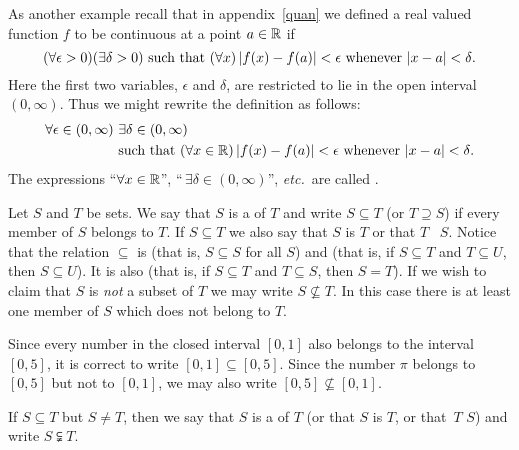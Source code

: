 As another example recall that in appendix~\ref{quan} we defined a real valued function $f$ to
be continuous at a point $a \in \mathbb{R}$ if
  \[(\forall\epsilon > 0)(\exists \delta > 0) \text{ such that
        $(\forall x)\, \lvert f(x)-f(a)\rvert < \epsilon$  whenever
            $\lvert x - a\rvert < \delta$}.\]
Here the first two variables, $\epsilon$ and $\delta$, are restricted to lie in the open
interval $(0, \infty)$. Thus we might rewrite the definition as follows:
  \[\begin{split}
    \forall\epsilon\in (0,\infty)\,\, &\exists\delta\in (0,\infty) \\
        &\text{such that ($\forall x \in \mathbb{R})\, \lvert f(x)-f(a)\rvert
        <\epsilon$ whenever $\lvert x-a\rvert < \delta$}.
  \end{split}\]
The expressions ``$\forall x \in \mathbb{R}$'', ``\,$\exists\delta\in (0, \infty)$'', \emph{etc.}\ are
called
.

\begin{defn} Let $S$ and $T$ be sets. We say that $S$ is a
 of $T$ and write
$S \subseteq T$ (or $T \supseteq S$) if every member of $S$ belongs to $T$. If $S \subseteq T$
we also say that $S$ is  $T$ or that $T$
~$S$.  Notice that the relation $\subseteq$ is
 (that is, $S \subseteq S$ for all $S$) and
 (that is, if $S \subseteq T$ and $T \subseteq U$,
then $S \subseteq U$). It is also
 (that is, if $S \subseteq T$ and $T \subseteq S$, then $S = T$). If we wish
to claim that $S$ is \emph{not} a subset of $T$ we may write $S \not\subseteq T$. In this case
there is at least one member of $S$ which does not belong to $T$.
\end{defn}

\begin{exam} Since every number in the closed interval $[0,1]$ also belongs to the interval
$[0,5]$, it is correct to write $[0, 1] \subseteq [0,5]$.  Since the number $\pi$ belongs to
$[0,5]$ but not to $[0,1]$, we may also write $[0,5] \not\subseteq [0,1]$.
\end{exam}

\begin{defn} If $S \subseteq T$ but $S \ne T$, then we say that $S$ is a
 of $T$ (or that $S$ is  $T$, or that~$T$
 $S$) and write
$S \subsetneqq T$.
\end{defn}

